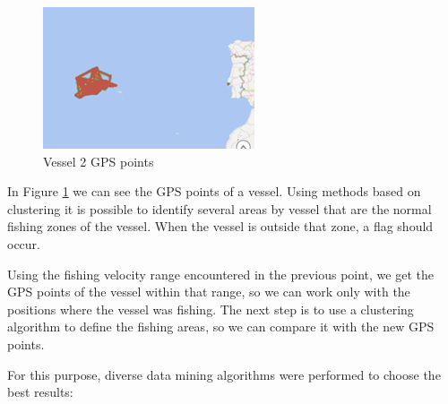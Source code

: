 \begin{figure}[H]
    \centering
    \includegraphics[width=0.8\linewidth]{Chapters/img/gps_vessel2.png}
    \caption{Vessel 2 GPS points}
    \label{fig:gps_vessel2}
\end{figure}

In Figure \ref{fig:gps_vessel2} we can see the GPS points of a vessel. Using methods based on clustering it is possible to identify several areas by vessel that are the normal fishing zones of the vessel. When the vessel is outside that zone, a flag should occur.

Using the fishing velocity range encountered in the previous point, we get the GPS points of the vessel within that range, so we can work only with the positions where the vessel was fishing. The next step is to use a clustering algorithm to define the fishing areas, so we can compare it with the new GPS points. 

For this purpose, diverse data mining algorithms were performed to choose the best results:

